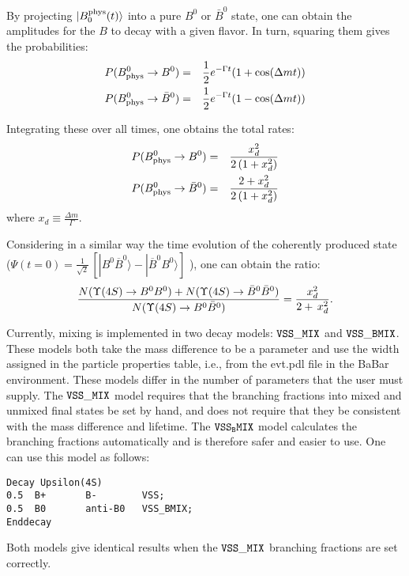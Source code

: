 By projecting $|B_{0}^{\rm phys}(t)\rangle$ into a pure $B^0$
or $\bar B^0$ state, one can obtain the amplitudes for the $B$ to decay with
a given flavor.  In turn, squaring them gives the probabilities:
\begin{eqnarray}
P(B_{\rm phys}^{0}\rightarrow B^0) & = & \frac{1}{2} e^{-\Gamma t} (1+\cos(\Delta m t))\\
P(B_{\rm phys}^{0}\rightarrow \bar B^0) & = & \frac{1}{2} e^{-\Gamma t} (1-\cos(\Delta m t))\\
\end{eqnarray}

Integrating these over all times, one obtains the total rates:
\begin{eqnarray}
P(B_{\rm phys}^{0}\rightarrow B^0)  & = & \frac{x_{d}^2}{2\,(1 + x_{d}^{2})}\\
P(B_{\rm phys}^{0}\rightarrow \bar B^0)  & = & \frac{2 + x_{d}^2}{2\,(1 + x_{d}^{2})}\\
\end{eqnarray}
where $x_d \equiv \frac{\Delta m}{\Gamma}$.

Considering in a similar way the time evolution of the coherently produced state ($\Psi(t = 0) = \frac{1}{\sqrt{2}}\,\left [ |B^{0} \overline{B}^{0} \rangle - |\overline{B}^{0} B^{0} \rangle \right ]$ ), one can obtain the ratio:
\begin{equation}
{ N(\Upsilon(4S)\rightarrow B^0B^0)+N(\Upsilon(4S)\rightarrow\bar B^0\bar B^0)
  \over N(\Upsilon(4S)\rightarrow B^0\bar B^0)}= \frac{x_{d}^{2}}{2 + \,x_{d}^{2}}.
\end{equation}

Currently, mixing is implemented in two decay models: 
$\tt VSS\_MIX$ and $\tt VSS\_BMIX$.  These models both take the mass
difference to be a parameter and use the width assigned in the particle
properties table, i.e., from the evt.pdl file in the BaBar environment.
These models differ in the number of parameters that
the user must supply. The $\tt VSS\_MIX$ model requires that the branching
fractions into mixed and unmixed final states be set by hand, and does not
require that they be consistent with the mass difference and lifetime.
The $\tt VSS_BMIX$ model calculates the branching fractions automatically
and is therefore safer and easier to use. One can use this model as follows:
\begin{verbatim}
Decay Upsilon(4S)
0.5  B+       B-        VSS;
0.5  B0       anti-B0   VSS_BMIX;
Enddecay
\end{verbatim}
Both models give identical results when the $\tt VSS\_MIX$ branching
fractions are set correctly.


